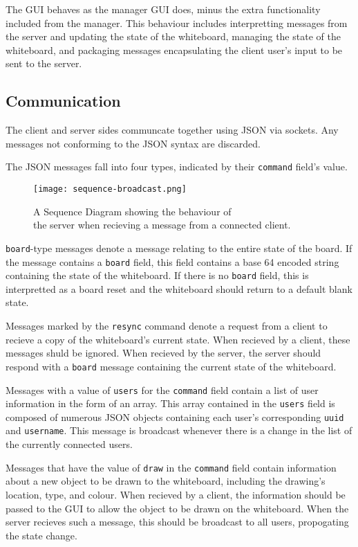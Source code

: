 \documentclass[12pt]{article}
\begin{document}
The GUI behaves as the manager GUI does, minus the extra functionality included from the manager. This behaviour includes interpretting messages from the server and updating the state of the whiteboard, managing the state of the whiteboard, and packaging messages encapsulating the client user's input to be sent to the server. 

\subsection{Communication}
The client and server sides communcate together using JSON via sockets. Any messages not conforming to the JSON syntax are discarded. 

The JSON messages fall into four types, indicated by their \texttt{command} field's value.

\begin{figure}[ht]
  \centering
  \texttt{[image: sequence-broadcast.png]}
  \caption{
    A Sequence Diagram showing the behaviour of \\ the server when recieving a message from a connected client.
  }
  \label{fig:broadcast}
\end{figure}

\texttt{board}-type messages denote a message relating to the entire state of the board. If the message contains a \texttt{board} field, this field contains a base 64 encoded string containing the state of the whiteboard. If there is no \texttt{board} field, this is interpretted as a board reset and the whiteboard should return to a default blank state.

Messages marked by the \texttt{resync} command denote a request from a client to recieve a copy of the whiteboard's current state. When recieved by a client, these messages shuld be ignored. When recieved by the server, the server should respond with a \texttt{board} message containing the current state of the whiteboard.

Messages with a value of \texttt{users} for the \texttt{command} field contain a list of user information in the form of an array. This array contained in the \texttt{users} field is composed of numerous JSON objects containing each user's corresponding \texttt{uuid} and \texttt{username}. This message is broadcast whenever there is a change in the list of the currently connected users.

Messages that have the value of \texttt{draw} in the \texttt{command} field contain information about a new object to be drawn to the whiteboard, including the drawing's location, type, and colour. When recieved by a client, the information should be passed to the GUI to allow the object to be drawn on the whiteboard. When the server recieves such a message, this should be broadcast to all users, propogating the state change.
\end{document}
